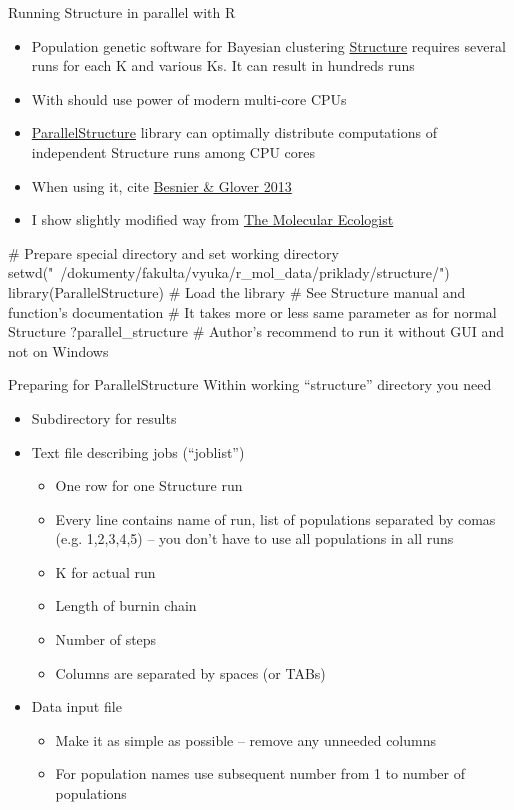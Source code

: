 \documentclass[compress, ucs, xelatex, 11pt, xcolor=svgnames,
  hyperref={
    bookmarks=true,
    unicode=true,
    colorlinks=true,
    pdftitle={Molecular data in R},
    plainpages=false,
    pdfauthor={Vojtech Zeisek},
    pdfsubject={Course about phylogeny and evolution in R},
    pdfcreator={XeLaTeX},
    pdfkeywords={R, evolution, phylogeny, molecular data},
    linkcolor=Tomato,
    anchorcolor=SaddleBrown,
    citecolor=Goldenrod,
    filecolor=DarkMagenta,
    menucolor=Sienna,
    urlcolor=DarkTurquoise,
    pdftex},
  url={hyphens, lowtilde} %
  ]{beamer}
\begin{document}
\begin{frame}[fragile]{Running Structure in parallel with R}
\begin{itemize}
 \item Population genetic software for Bayesian clustering \href{http://pritchardlab.stanford.edu/software.html}{Structure} requires several runs for each K and various Ks. It can result in hundreds runs
 \item With should use power of modern multi-core CPUs
 \item \href{https://r-forge.r-project.org/R/?group_id=1636}{ParallelStructure} library can optimally distribute computations of independent Structure runs among CPU cores
 \item When using it, cite \href{http://www.plosone.org/article/info\%3Adoi\%2F10.1371\%2Fjournal.pone.0070651}{Besnier \& Glover 2013}
 \item I show slightly modified way from \href{http://www.molecularecologist.com/2013/09/using-r-to-run-parallel-analyses-of-population-genetic-data-in-structure-parallelstructure/}{The Molecular Ecologist}
\end{itemize}
  \begin{spluscode}
    # Prepare special directory and set working directory
    setwd("~/dokumenty/fakulta/vyuka/r_mol_data/priklady/structure/")
    library(ParallelStructure) # Load the library
    # See Structure manual and function's documentation
    # It takes more or less same parameter as for normal Structure
    ?parallel_structure
    # Author's recommend to run it without GUI and not on Windows
  \end{spluscode}
\end{frame}

\begin{frame}{Preparing for ParallelStructure}
Within working ``structure'' directory you need
\begin{itemize}
 \item Subdirectory for results
 \item Text file describing jobs (``joblist'')
  \begin{itemize}
    \item One row for one Structure run
    \item Every line contains name of run, list of populations separated by comas (e.g. 1,2,3,4,5) -- you don't have to use all populations in all runs
    \item K for actual run
    \item Length of burnin chain
    \item Number of steps
    \item Columns are separated by spaces (or TABs)
  \end{itemize}
 \item Data input file
  \begin{itemize}
    \item Make it as simple as possible -- remove any unneeded columns
    \item For population names use subsequent number from 1 to number of populations
  \end{itemize}
\end{itemize}
\end{frame}
\end{document}
